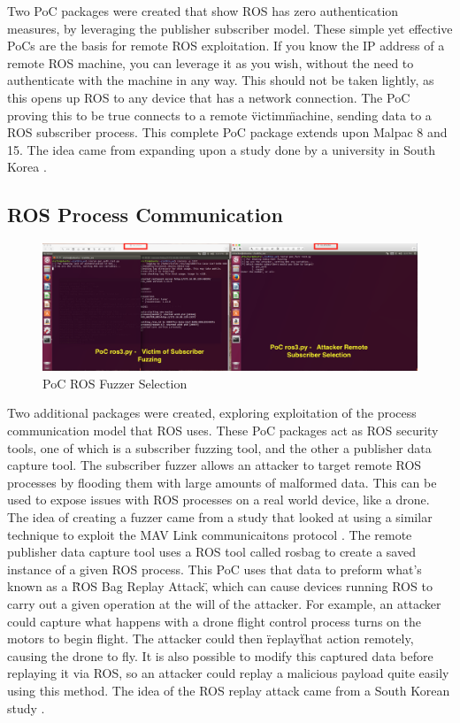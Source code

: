 \documentclass[IEEEtran,letterpaper,10pt,notitlepage,draftclsnofoot]{article}
\begin{document}
Two PoC packages were created that show ROS has zero authentication measures, by leveraging the publisher subscriber model.
These simple yet effective PoCs are the basis for remote ROS exploitation. If you know the IP address of a remote ROS machine, you can leverage it as you wish, without the need
to authenticate with the machine in any way. This should not be taken lightly, as this opens up ROS to any device that has a network connection. The PoC proving this to be true
connects to a remote \"victim\" machine, sending data to a ROS subscriber process. This complete PoC package extends upon Malpac 8 and 15. The idea came from expanding upon a study done by a university in South Korea \cite{ROSVulnCounter}.

\subsection{ROS Process Communication}
\begin{figure}[H]
  \centering
    \includegraphics[width=\textwidth]{poc2}
    \caption{PoC ROS Fuzzer Selection}
\end{figure}

Two additional packages were created, exploring exploitation of the process communication model that ROS uses. These PoC packages act as ROS security tools, one of which is a subscriber
fuzzing tool, and the other a publisher data capture tool. The subscriber fuzzer allows an attacker to target remote ROS processes by flooding them with large amounts of malformed data.
This can be used to expose issues with ROS processes on a real world device, like a drone. The idea of creating a fuzzer came from a study that looked at using a similar technique to exploit the MAV Link communicaitons protocol \cite{ROSMAVFuzz}.
The remote publisher data capture tool uses a ROS tool called rosbag to create a saved instance
of a given ROS process. This PoC uses that data to preform what's known as a \"ROS Bag Replay Attack\", which can cause devices running ROS to carry out a given operation at the will of the attacker.
For example, an attacker could capture what happens with a drone flight control process turns on the motors to begin flight. The attacker could then \"replay\" that action remotely, causing the drone
to fly. It is also possible to modify this captured data before replaying it via ROS, so an attacker could replay a malicious payload quite easily using this method. The idea of the ROS replay attack came from a
South Korean study \cite{ROSVulnCounter}.
\end{document}
